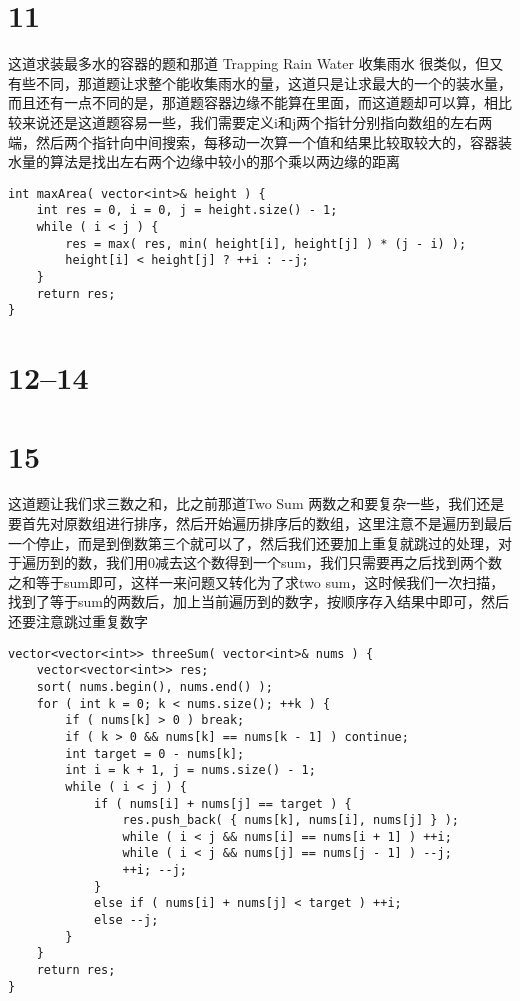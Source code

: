 \documentclass[12pt,a4paper]{article}
\begin{document}
\section{11}
\begin{CJK}{UTF8}{gbsn}
这道求装最多水的容器的题和那道 Trapping Rain Water 收集雨水 很类似，但又有些不同，那道题让求整个能收集雨水的量，这道只是让求最大的一个的装水量，而且还有一点不同的是，那道题容器边缘不能算在里面，而这道题却可以算，相比较来说还是这道题容易一些，我们需要定义i和j两个指针分别指向数组的左右两端，然后两个指针向中间搜索，每移动一次算一个值和结果比较取较大的，容器装水量的算法是找出左右两个边缘中较小的那个乘以两边缘的距离
\end{CJK}
\begin{lstlisting}
int maxArea( vector<int>& height ) {
	int res = 0, i = 0, j = height.size() - 1;
	while ( i < j ) {
		res = max( res, min( height[i], height[j] ) * (j - i) );
		height[i] < height[j] ? ++i : --j;
	}
	return res;
}
\end{lstlisting}

\section{12--14}

\section{15}
\begin{CJK}{UTF8}{gbsn}
这道题让我们求三数之和，比之前那道Two Sum 两数之和要复杂一些，我们还是要首先对原数组进行排序，然后开始遍历排序后的数组，这里注意不是遍历到最后一个停止，而是到倒数第三个就可以了，然后我们还要加上重复就跳过的处理，对于遍历到的数，我们用0减去这个数得到一个sum，我们只需要再之后找到两个数之和等于sum即可，这样一来问题又转化为了求two sum，这时候我们一次扫描，找到了等于sum的两数后，加上当前遍历到的数字，按顺序存入结果中即可，然后还要注意跳过重复数字
\end{CJK}
\begin{lstlisting}
vector<vector<int>> threeSum( vector<int>& nums ) {
	vector<vector<int>> res;
	sort( nums.begin(), nums.end() );
	for ( int k = 0; k < nums.size(); ++k ) {
		if ( nums[k] > 0 ) break;
		if ( k > 0 && nums[k] == nums[k - 1] ) continue;
		int target = 0 - nums[k];
		int i = k + 1, j = nums.size() - 1;
		while ( i < j ) {
			if ( nums[i] + nums[j] == target ) {
				res.push_back( { nums[k], nums[i], nums[j] } );
				while ( i < j && nums[i] == nums[i + 1] ) ++i;
				while ( i < j && nums[j] == nums[j - 1] ) --j;
				++i; --j;
			}
			else if ( nums[i] + nums[j] < target ) ++i;
			else --j;
		}
	}
	return res;
}
\end{lstlisting}
\end{document}
